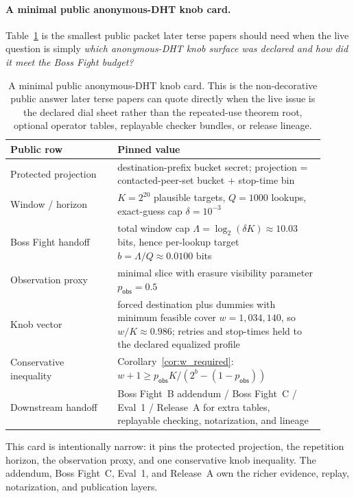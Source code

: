 \documentclass[11pt]{article}
\begin{document}
\paragraph{A minimal public anonymous-DHT knob card.}
Table~\ref{tab:minimal-dialsheet-card} is the smallest public packet later terse papers should need when the live question is simply \emph{which anonymous-DHT knob surface was declared and how did it meet the Boss Fight budget?}

\begin{table}[t]
\centering
\small
\begin{tabular}{@{}p{0.31\linewidth}p{0.60\linewidth}@{}}
\toprule
\textbf{Public row} & \textbf{Pinned value}\\
\midrule
Protected projection & destination-prefix bucket secret; projection = contacted-peer-set bucket + stop-time bin \\
Window / horizon & $K=2^{20}$ plausible targets, $Q=1000$ lookups, exact-guess cap $\delta=10^{-3}$ \\
Boss Fight handoff & total window cap $\Lambda=\log_2(\delta K)\approx 10.03$ bits, hence per-lookup target $b=\Lambda/Q\approx 0.0100$ bits \\
Observation proxy & minimal slice with erasure visibility parameter $p_{\mathsf{obs}}=0.5$ \\
Knob vector & forced destination plus dummies with minimum feasible cover $w=1{,}034{,}140$, so $w/K\approx 0.986$; retries and stop-times held to the declared equalized profile \\
Conservative inequality & Corollary~\ref{cor:w_required}: $w{+}1 \ge p_{\mathsf{obs}}K/(2^b-(1-p_{\mathsf{obs}}))$ \\
Downstream handoff & Boss Fight~B addendum / Boss Fight~C / Eval~1 / Release~A for extra tables, replayable checking, notarization, and lineage \\
\bottomrule
\end{tabular}
\caption{A minimal public anonymous-DHT knob card. This is the non-decorative public answer later terse papers can quote directly when the live issue is the declared dial sheet rather than the repeated-use theorem root, optional operator tables, replayable checker bundles, or release lineage.}
\label{tab:minimal-dialsheet-card}
\end{table}

This card is intentionally narrow: it pins the protected projection, the repetition horizon, the observation proxy, and one conservative knob inequality. The addendum, Boss Fight~C, Eval~1, and Release~A own the richer evidence, replay, notarization, and publication layers.\cite{series:bossfightBaddendum,series:bossfightC,series:notarizedcerts,series:releaseproperty}
\end{document}
